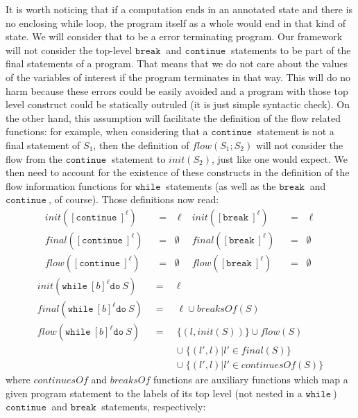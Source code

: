 \documentclass[a4wide,12pt]{article}
\def\eq{\;\; = \;\;}
\def\while{\texttt{while}\ }
\def\do {\texttt{do}\ }
\def\cont {\texttt{continue}\ }
\def\break{\texttt{break}\ }
\begin{document}
It is worth noticing that if a computation ends in an annotated state and there is
no enclosing while loop, the program itself as a whole would end in that kind of state.
We will consider that to be a error terminating program. Our framework will not consider
the top-level $\break$ and $\cont$ statements to be part of the final statements of
a program. That means that we do not care about the values of the variables of interest
if the program terminates in that way. This will do no harm because these errors could be easily
avoided and a program with those top level construct could be statically outruled (it is just simple syntactic check).
On the other hand, this assumption will facilitate the definition of
the flow related functions: for example, when considering that a $\cont$ statement is not
a final statement of $S_1$, then the definition of $flow(S_1;S_2)$ will not consider the flow
from the $\cont$ statement to $init(S_2)$, just like one would expect. We then need to account
for the existence of these constructs in the definition of the flow information functions
for $\while$ statements (as well as the $\break$ and $\cont$, of course).
Those definitions now read:
\begin{align*}
init ([\cont]^\ell) &\eq \ell & init ([\break]^\ell) &\eq \ell \\
final([\cont]^\ell) &\eq \emptyset & final([\break]^\ell) &\eq \emptyset \\
flow ([\cont]^\ell) &\eq \emptyset & flow ([\break]^\ell) &\eq \emptyset
\end{align*}
\begin{eqnarray*}
init (\while [b]^\ell \do S) &\eq& \ell \\
final(\while [b]^\ell \do S) &\eq& \ell \cup breaksOf(S) \\
flow (\while [b]^\ell \do S) &\eq& \{(l,init(S))\} \cup flow(S) \\
                            & & \cup\; \{(l',l) | l' \in final(S)\} \\
                            & & \cup\; \{(l',l) | l' \in continuesOf(S)\}
\end{eqnarray*}
where $continuesOf$ and $breaksOf$ functions are auxiliary functions which map a given program statement
to the labels of its top level (not nested in a $\while$) $\cont$ and $\break$ statements, respectively:
 
\end{document}
